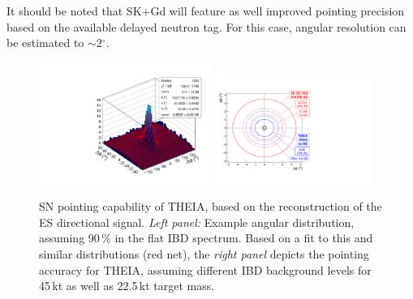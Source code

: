 It should be noted that SK+Gd will feature as well improved pointing precision based on the available delayed neutron tag. For this case, angular resolution can be estimated to $\sim$2$^{\circ}$.
\begin{figure}[h!]
\centering
\includegraphics[width=0.5\textwidth]{pics/sn_directionality_fit.pdf}
\hfill
\includegraphics[width=0.46\textwidth]{pics/sn_position_resolution.pdf}
\caption{SN pointing capability of THEIA, based on the reconstruction of the ES directional signal. {\it Left panel:} Example angular distribution, assuming 90\,\% in the flat IBD spectrum. Based on a fit to this and similar distributions (red net), the {\it right panel} depicts the pointing accuracy for THEIA, assuming different IBD background levels for 45\,kt as well as 22.5\,kt target mass.}
\label{fig:snpointing}
\end{figure}
